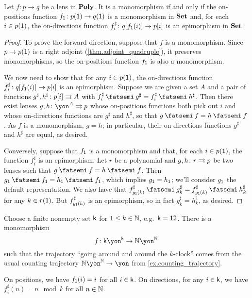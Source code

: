 \documentclass[Book-Poly]{subfiles}
\begin{document}
\begin{proposition}\label{prop.monics_in_poly}
Let $f \colon p \to q$ be a lens in $\mathbf{Poly}$. It is a monomorphism if and only if the on-positions function $f_{\textsf{1}} \colon p(\textsf{1}) \to q(\textsf{1})$ is a monomorphism in $\mathbf{Set}$ and, for each $i \in p(\textsf{1})$, the on-directions function $f^\sharp_i \colon q[f_{\textsf{1}}(i)]\to p[i]$ is an epimorphism in $\mathbf{Set}$.
\end{proposition}
\begin{proof}
To prove the forward direction, suppose that $f$ is a monomorphism.
Since $p\mapsto p(\textsf{1})$ is a right adjoint (\cref{thm.adjoint_quadruple}), it preserves monomorphisms, so the on-positions function $f_{\textsf{1}}$ is also a monomorphism.

We now need to show that for any $i\in p(\textsf{1})$, the on-directions function $f^\sharp_i \colon q[f_{\textsf{1}}(i)] \to p[i]$ is an epimorphism.
Suppose we are given a set $A$ and a pair of functions $g^\sharp,h^\sharp\colon p[i]\rightrightarrows A$ with $f^\sharp_i \then g^\sharp = f^\sharp_i \then h^\sharp$.
Then there exist lenses $g,h \colon \yon^A \tto p$ whose on-positions functions both pick out $i$ and whose on-directions functions are $g^\sharp$ and $h^\sharp$, so that $g \then f = h \then f$.
As $f$ is a monomorphism, $g = h$; in particular, their on-directions functions $g^\sharp$ and $h^\sharp$ are equal, as desired.

Conversely, suppose that $f_{\textsf{1}}$ is a monomorphism and that, for each $i\in p(\textsf{1})$, the function $f^\sharp_i$ is an epimorphism.
Let $r$ be a polynomial and $g,h\colon r\rightrightarrows p$ be two lenses such that $g \then f = h \then f$.
Then $g_\1 \then f_\1 = h_\1 \then f_\1$, which implies $g_{\textsf{1}} = h_{\textsf{1}}$; we'll consider $g_{\textsf{1}}$ the default representation.
We also have that $f^\sharp_{g_\1(k)} \then g^\sharp_k = f^\sharp_{g_\1(k)} \then h^\sharp_k$ for any $k \in r(\textsf{1})$. But $f^\sharp_{g_{\textsf{1}}(k)}$ is an epimorphism, so in fact $g^\sharp_k = h^\sharp_k$, as desired.
\end{proof}

\begin{example}\label{ex.clock_in_N}
Choose a finite nonempty set $\mathsf{k}$ for $1\leq k\in\mathbb{N}$, e.g.\ $\mathsf{k}=\textsf{1}\textsf{2}$. There is a monomorphism
\[
f \colon\ord{k}\yon^{\ord{k}}\to\nn\yon^\nn
\]
such that the trajectory ``going around and around the $k$-clock'' comes from the usual counting trajectory $\nn\yon^\nn\to\yon$ from \cref{ex.counting_trajectory}.

On positions, we have $f_{\textsf{1}}(i)=i$ for all $i \in \mathsf{k}$. On directions, for any $i \in \mathsf{k}$, we have $f^\sharp_i(n) = n \mod k$ for all $n \in \mathbb{N}$.
\end{example}
\end{document}
